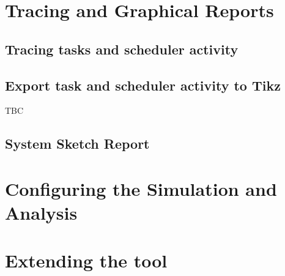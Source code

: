 \documentclass{article}
\begin{document}
\section{Tracing and Graphical Reports}
\label{sec:tracing}

\subsection{Tracing tasks and scheduler activity}
\label{sec:tracing}


\subsection{Export task and scheduler activity to Tikz}
\label{sec:activity2tikz}

TBC
%

\subsection{System Sketch Report}
\label{sec:sketch_report}



\section{Configuring the Simulation and Analysis}
\label{sec:conf}



\section{Extending the tool}
\label{sec:extending}




%


\printindex
\end{document}

